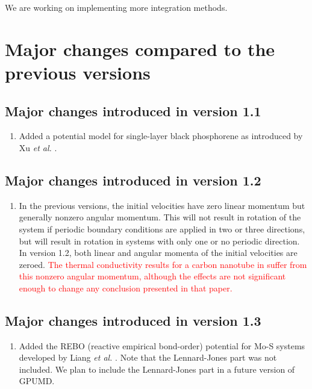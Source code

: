 \documentclass[12pt,a4paper]{report}
\begin{document}
We are working on implementing more integration methods.

\section{Major changes compared to the previous versions}

\subsection{Major changes introduced in version 1.1}
\begin{enumerate}
\item Added a potential model for single-layer black phosphorene as introduced by Xu \textit{et al.} \cite{xu2015jap}.
\end{enumerate}

\subsection{Major changes introduced in version 1.2}
\begin{enumerate}
\item In the previous versions, the initial velocities have zero linear momentum but generally nonzero angular momentum. This will not result in rotation of the system if periodic boundary conditions are applied in two or three directions, but will result in rotation in systems with only one or no periodic direction. In version 1.2, both linear and angular momenta of the initial velocities are zeroed. \textcolor{red}{The thermal conductivity results for a carbon nanotube in \cite{fan2015prb} suffer from this nonzero angular momentum, although the effects are not significant enough to change any conclusion presented in that paper.}
\end{enumerate}

\subsection{Major changes introduced in version 1.3}
\begin{enumerate}
\item Added the REBO (reactive empirical bond-order) potential for Mo-S systems developed by Liang \textit{et al.} \cite{liang2009prb,liang2012prb_erratum}. Note that the Lennard-Jones part was not included. We plan to include the Lennard-Jones part in a future version of GPUMD. 
\end{enumerate}
\end{document}
